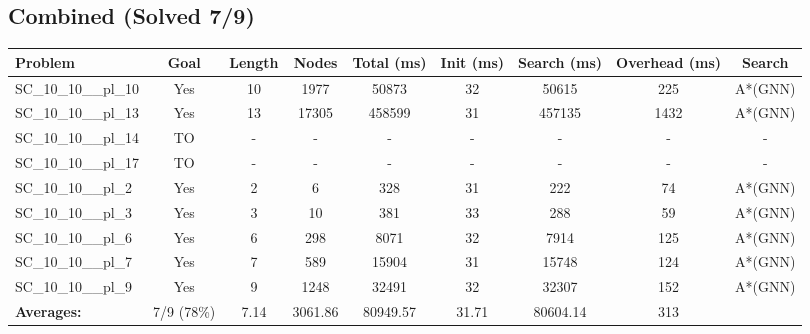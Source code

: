 \documentclass{article}
\begin{document}
\subsection*{Combined (Solved 7/9)}
\begin{tabular}{lcccccccc}
\toprule
Problem & Goal & Length & Nodes & Total (ms) & Init (ms) & Search (ms) & Overhead (ms) & Search \\
\midrule
SC\_10\_10\_\_pl\_10 & Yes & 10 & 1977 & 50873 & 32 & 50615 & 225 & A*(GNN) \\
SC\_10\_10\_\_pl\_13 & Yes & 13 & 17305 & 458599 & 31 & 457135 & 1432 & A*(GNN) \\
SC\_10\_10\_\_pl\_14 & TO & - & - & - & - & - & - & - \\
SC\_10\_10\_\_pl\_17 & TO & - & - & - & - & - & - & - \\
SC\_10\_10\_\_pl\_2 & Yes & 2 & 6 & 328 & 31 & 222 & 74 & A*(GNN) \\
SC\_10\_10\_\_pl\_3 & Yes & 3 & 10 & 381 & 33 & 288 & 59 & A*(GNN) \\
SC\_10\_10\_\_pl\_6 & Yes & 6 & 298 & 8071 & 32 & 7914 & 125 & A*(GNN) \\
SC\_10\_10\_\_pl\_7 & Yes & 7 & 589 & 15904 & 31 & 15748 & 124 & A*(GNN) \\
SC\_10\_10\_\_pl\_9 & Yes & 9 & 1248 & 32491 & 32 & 32307 & 152 & A*(GNN) \\
\textbf{Averages:} & 7/9 (78\%) & 7.14 & 3061.86 & 80949.57 & 31.71 & 80604.14 & 313 & \\
\bottomrule
\end{tabular}
\\[0.7cm]
\end{document}
